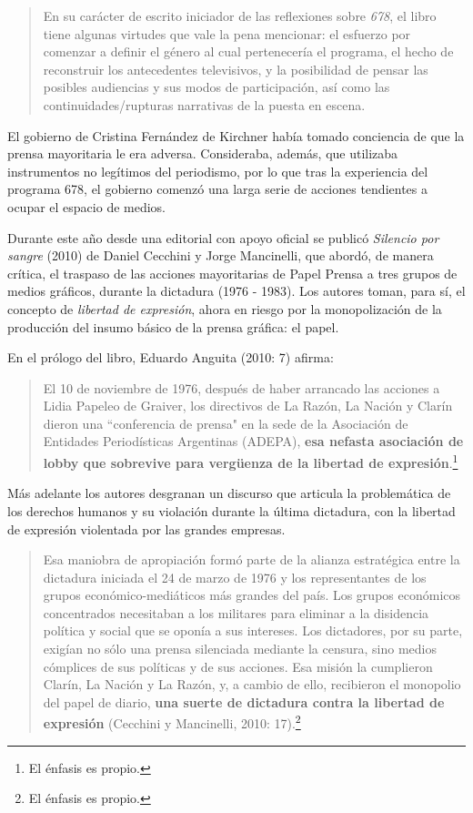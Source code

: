 {\begin{quote}
En su carácter de escrito iniciador de las reflexiones sobre \emph{678}, el libro tiene algunas virtudes que vale la pena mencionar: el esfuerzo por comenzar a definir el género al cual pertenecería el programa, el hecho de reconstruir los antecedentes televisivos, y la posibilidad de pensar las posibles audiencias y sus modos de participación, así como las continuidades/rupturas narrativas de la puesta en escena.
\end{quote}

El gobierno de Cristina Fernández de Kirchner había tomado conciencia de que la prensa mayoritaria le era adversa. Consideraba, además, que utilizaba instrumentos no legítimos del periodismo, por lo que tras la experiencia del programa 678, el gobierno comenzó una larga serie de acciones tendientes a ocupar el espacio de medios.

Durante este año desde una editorial con apoyo oficial se publicó \emph{Silencio por sangre} (2010) de Daniel Cecchini y Jorge Mancinelli, que abordó, de manera crítica, el traspaso de las acciones mayoritarias de Papel Prensa a tres grupos de medios gráficos, durante la dictadura (1976 - 1983). Los autores toman, para sí, el concepto de \emph{libertad de expresión}, ahora en riesgo por la monopolización de la producción del insumo básico de la prensa gráfica: el papel.

En el prólogo del libro, Eduardo Anguita (2010: 7) afirma:

\begin{quote}
El 10 de noviembre de 1976, después de haber arrancado las acciones a Lidia Papeleo de Graiver, los directivos de La Razón, La Nación y Clarín dieron una ``conferencia de prensa" en la sede de la Asociación de Entidades Periodísticas Argentinas (ADEPA), \textbf{esa nefasta asociación de lobby que sobrevive para vergüenza de la libertad de expresión}.\footnote{El énfasis es propio.}
\end{quote}

Más adelante los autores desgranan un discurso que articula la problemática de los derechos humanos y su violación durante la última dictadura, con la libertad de expresión violentada por las grandes empresas.

\begin{quote}
Esa maniobra de apropiación formó parte de la alianza estratégica entre la dictadura iniciada el 24 de marzo de 1976 y los representantes de los grupos económico-mediáticos más grandes del país. Los grupos económicos concentrados necesitaban a los militares para eliminar a la disidencia política y social que se oponía a sus intereses. Los dictadores, por su parte, exigían no sólo una prensa silenciada mediante la censura, sino medios cómplices de sus políticas y de sus acciones. Esa misión la cumplieron Clarín, La Nación y La Razón, y, a cambio de ello, recibieron el monopolio del papel de diario, \textbf{una suerte de dictadura contra la libertad de expresión} (Cecchini y Mancinelli, 2010: 17).\footnote{El énfasis es propio.}
\end{quote}

}
